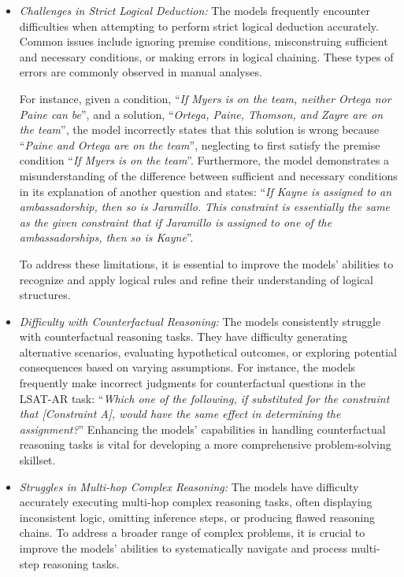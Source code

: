 \begin{itemize}
\item \textit{Challenges in Strict Logical Deduction:} The models frequently encounter difficulties when attempting to perform strict logical deduction accurately. Common issues include ignoring premise conditions, misconstruing sufficient and necessary conditions, or making errors in logical chaining. These types of errors are commonly observed in manual analyses.

For instance, given a condition, ``\textit{If Myers is on the team, neither Ortega nor Paine can be}'', and a solution, ``\textit{Ortega, Paine, Thomson, and Zayre are on the team}'', the model incorrectly states that this solution is wrong because ``\textit{Paine and Ortega are on the team}'', neglecting to first satisfy the premise condition ``\textit{If Myers is on the team}''. Furthermore, the model demonstrates a misunderstanding of the difference between sufficient and necessary conditions in its explanation of another question and states: ``\textit{If Kayne is assigned to an ambassadorship, then so is Jaramillo. This constraint is essentially the same as the given constraint that if Jaramillo is assigned to one of the ambassadorships, then so is Kayne}''. 

To address these limitations, it is essential to improve the models' abilities to recognize and apply logical rules and refine their understanding of logical structures.

\item \textit{Difficulty with Counterfactual Reasoning:} The models consistently struggle with counterfactual reasoning tasks. They have difficulty generating alternative scenarios, evaluating hypothetical outcomes, or exploring potential consequences based on varying assumptions. For instance, the models frequently make incorrect judgments for counterfactual questions in the LSAT-AR task: ``\textit{Which one of the following, if substituted for the constraint that [Constraint A], would have the same effect in determining the assignment?}'' Enhancing the models' capabilities in handling counterfactual reasoning tasks is vital for developing a more comprehensive problem-solving skillset.

\item \textit{Struggles in Multi-hop Complex Reasoning:} The models have difficulty accurately executing multi-hop complex reasoning tasks, often displaying inconsistent logic, omitting inference steps, or producing flawed reasoning chains. To address a broader range of complex problems, it is crucial to improve the models' abilities to systematically navigate and process multi-step reasoning tasks.


\end{itemize}
